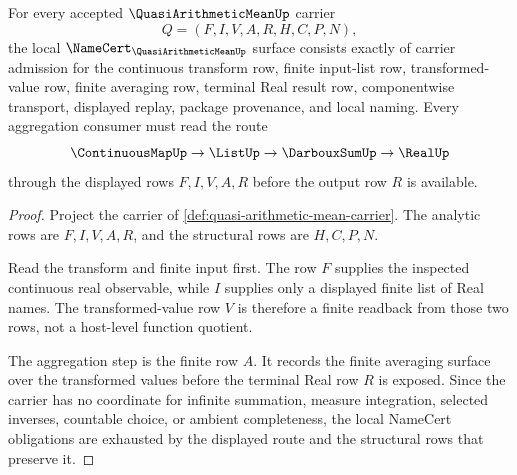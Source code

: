 \begin{theorem}
\label{thm:quasi-arithmetic-mean-namecert-obligations}
For every accepted $\QuasiArithmeticMeanUp$ carrier
$$
Q=(F,I,V,A,R,H,C,P,N),
$$
the local $\NameCert_{\QuasiArithmeticMeanUp}$ surface consists exactly of carrier admission for the continuous transform row, finite input-list row, transformed-value row, finite averaging row, terminal Real result row, componentwise transport, displayed replay, package provenance, and local naming. Every aggregation consumer must read the route
$$
\ContinuousMapUp \to \ListUp \to \DarbouxSumUp \to \RealUp
$$
through the displayed rows $F,I,V,A,R$ before the output row $R$ is available.
\end{theorem}
\begin{proof}
Project the carrier of \autoref{def:quasi-arithmetic-mean-carrier}. The analytic rows are $F,I,V,A,R$, and the structural rows are $H,C,P,N$.

Read the transform and finite input first. The row $F$ supplies the inspected continuous real observable, while $I$ supplies only a displayed finite list of Real names. The transformed-value row $V$ is therefore a finite readback from those two rows, not a host-level function quotient.

The aggregation step is the finite row $A$. It records the finite averaging surface over the transformed values before the terminal Real row $R$ is exposed. Since the carrier has no coordinate for infinite summation, measure integration, selected inverses, countable choice, or ambient completeness, the local NameCert obligations are exhausted by the displayed route and the structural rows that preserve it.
\end{proof}

